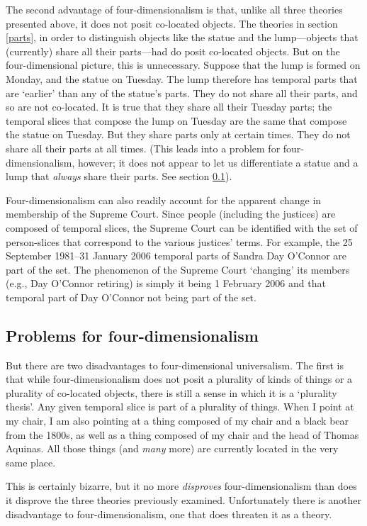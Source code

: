 \documentclass[11pt]{article}
\begin{document}
\begin{spacing}{1.5}
The second advantage of four-dimensionalism is that, unlike all three
theories presented above, it does not posit co-located objects.  The
theories in section \ref{parts}, in order to distinguish objects like
the statue and the lump---objects that (currently) share all their
parts---had do posit co-located objects.  But on the four-dimensional
picture, this is unnecessary.  Suppose that the lump is formed on
Monday, and the statue on Tuesday.  The lump therefore has temporal
parts that are `earlier' than any of the statue's parts.  They do not
share all their parts, and so are not co-located.  It is true that
they share all their Tuesday parts; the temporal slices that compose
the lump on Tuesday are the same that compose the statue on Tuesday.
But they share parts only at certain times.  They do not share all
their parts at all times.  (This leads into a problem for
four-dimensionalism, however; it does not appear to let us
differentiate a statue and a lump that {\em always} share their parts.
See section \ref{4dp}).

Four-dimensionalism can also readily account for the apparent change
in membership of the Supreme Court.  Since people (including the
justices) are composed of temporal slices, the Supreme Court can be
identified with the set of person-slices that correspond to the
various justices' terms.  For example, the 25 September 1981--31
January 2006 temporal parts of Sandra Day O'Connor are part of the
set.  The phenomenon of the Supreme Court `changing' its members
(e.g., Day O'Connor retiring) is simply it being 1 February 2006 and
that temporal part of Day O'Connor not being part of the set.

\subsection{Problems for four-dimensionalism}
\label{4dp}
But there are two disadvantages to four-dimensional universalism.  The
first is that while four-dimensionalism does not posit a plurality of
kinds of things or a plurality of co-located objects, there is still a
sense in which it is a `plurality thesis'.  Any given temporal slice
is part of a plurality of things.  When I point at my chair, I am also
pointing at a thing composed of my chair and a black bear from the
1800s, as well as a thing composed of my chair and the head of Thomas
Aquinas.  All those things (and {\em many} more) are currently located
in the very same place.

This is certainly bizarre, but it no more {\em disproves}
four-dimensionalism than does it disprove the three theories
previously examined.  Unfortunately there is another disadvantage to
four-dimensionalism, one that does threaten it as a theory.


\end{spacing}
\end{document}

